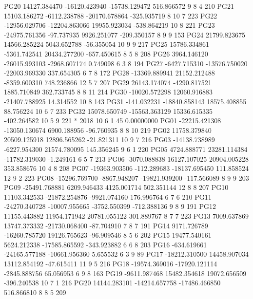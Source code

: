 PG20  14127.384470 -16120.423940 -15738.129472    516.866572  9  8  4 210       
PG21  15103.186272  -6112.238788 -20170.678864   -325.935719  8 10  7 223       
PG22 -12956.029706 -12204.863066  19955.923034   -538.864219 10  8    221       
PG23 -24975.761356    -97.737935   9926.251077   -209.350157  8  9  9 153       
PG24  21799.823675  14566.285224   5043.652788    -56.355054 10  9  9 217       
PG25  15786.334861  -5361.742541  20434.277200   -657.450615  8  5  8 208       
PG26   3964.146120 -26015.993103  -2968.607174      0.749098  6  3  8 194       
PG27  -6427.715310 -13576.750020 -22003.969330    337.654305  6  7  8 172       
PG28 -13369.889941  21152.212488  -8359.600310    748.236866 12  5  7 207       
PG29  26143.174074  -4290.817521   1885.710849    362.733745  8  8 11 214       
PG30 -10020.572298  12060.916883 -21407.788925     14.314552 10  8    143       
PG31   -141.032231 -18840.858143  18575.408855     88.756224 10  6  7 233       
PG32  15078.650749 -15563.363129  15336.615335   -402.264582 10  5  9 221       
*  2018 10  6  1 45  0.00000000
PG01 -22215.421308 -13050.130674   6900.188956    -96.760935  8  8 10 219       
PG02  11758.379840  20509.125918  12896.565262    -21.821311 10  9  7 216       
PG03 -14138.738989  -6227.954300  21574.780095    145.356245  9  6  1 220       
PG05   4724.888771  23281.114384 -11782.319030     -1.249161  6  5  7 213       
PG06  -3070.088838  16127.107025  20904.005228    353.858676 10  4  8 208       
PG07 -19363.903506   -112.289683 -18137.695450    111.858524 12  9  2 223       
PG08 -15296.769700  -8867.948207 -19821.939200   -117.566089  8  9  9 203       
PG09 -25491.768881   6209.946433   4125.001714    502.351144 12  8  8 207       
PG10  11103.342533 -21872.254876  -9921.074160    176.996764  6  7  6 210       
PG11 -24270.340728 -10007.955665  -3752.550399   -712.388136  9  8  9 191       
PG12  11155.443882  11954.171942  20781.055122    301.889767  8  7  7 223       
PG13   7009.637869  13747.373332 -21730.068400    -87.704910  7  8  7 191       
PG14   9171.726789 -16260.785720  19126.765623    -96.909546  8  5  6 202       
PG15  19477.540161   5624.212338 -17585.865592   -343.923882  6  6  8 203       
PG16   -634.619661 -24165.577188 -10661.956360      5.655532  6  3  9  89       
PG17 -18212.310500  14458.907034  13112.854192    -47.615411 11  9  5 216       
PG18 -19574.369016 -17920.121114  -2845.888756     65.056953  6  9  8 163       
PG19  -9611.987468  15482.354618  19072.656509   -396.240538 10  7  1 216       
PG20  14144.283101 -14214.657758 -17486.466850    516.866810  8  8  5 209       
